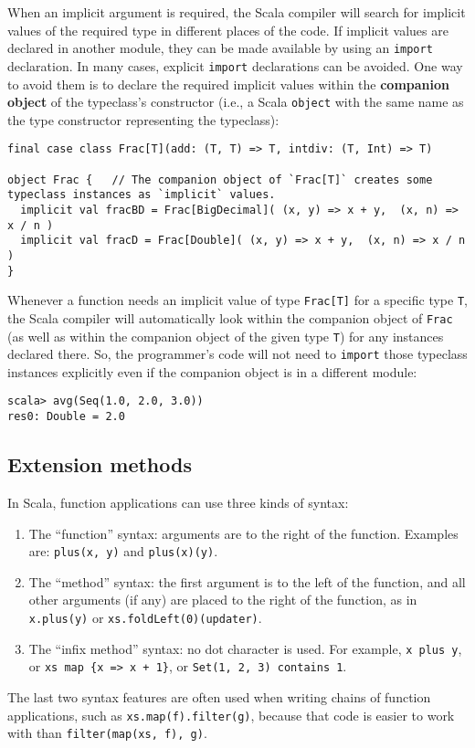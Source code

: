 When an implicit argument is required, the Scala compiler will search
for implicit values of the required type in different places of the
code. If implicit values are declared in another module, they can
be made available by using an \lstinline!import! declaration. In
many cases, explicit \lstinline!import! declarations can be avoided.
One way to avoid them is to declare the required implicit values within
the \textbf{companion object} of the typeclass\textsf{'}s
constructor (i.e., a Scala \lstinline!object! with the same name
as the type constructor representing the typeclass):
\begin{lstlisting}
final case class Frac[T](add: (T, T) => T, intdiv: (T, Int) => T)

object Frac {   // The companion object of `Frac[T]` creates some typeclass instances as `implicit` values.
  implicit val fracBD = Frac[BigDecimal]( (x, y) => x + y,  (x, n) => x / n )
  implicit val fracD = Frac[Double]( (x, y) => x + y,  (x, n) => x / n )
}
\end{lstlisting}
Whenever a function needs an implicit value of type \lstinline!Frac[T]!
for a specific type \lstinline!T!, the Scala compiler will automatically
look within the companion object of \lstinline!Frac! (as well as
within the companion object of the given type \lstinline!T!) for
any instances declared there. So, the programmer\textsf{'}s code will not need
to \lstinline!import! those typeclass instances explicitly even if
the companion object is in a different module:
\begin{lstlisting}
scala> avg(Seq(1.0, 2.0, 3.0))
res0: Double = 2.0
\end{lstlisting}


\subsection{Extension methods}

In Scala, function applications can use three kinds of syntax: 
\begin{enumerate}
\item The \textsf{``}function\textsf{''} syntax: arguments are to the right of the function.
Examples are: \lstinline!plus(x, y)! and \lstinline!plus(x)(y)!.
\item The \textsf{``}method\textsf{''} syntax: the first argument is to the left of the
function, and all other arguments (if any) are placed to the right
of the function, as in \lstinline!x.plus(y)! or \lstinline!xs.foldLeft(0)(updater)!.
\item The \textsf{``}infix method\textsf{''} syntax: no dot character is used. For example,
\lstinline!x plus y!, or \lstinline!xs map {x => x + 1}!, or \lstinline!Set(1, 2, 3) contains 1!.
\end{enumerate}
The last two syntax features are often used when writing chains of
function applications, such as \lstinline!xs.map(f).filter(g)!, because
that code is easier to work with than \lstinline!filter(map(xs, f), g)!. 

